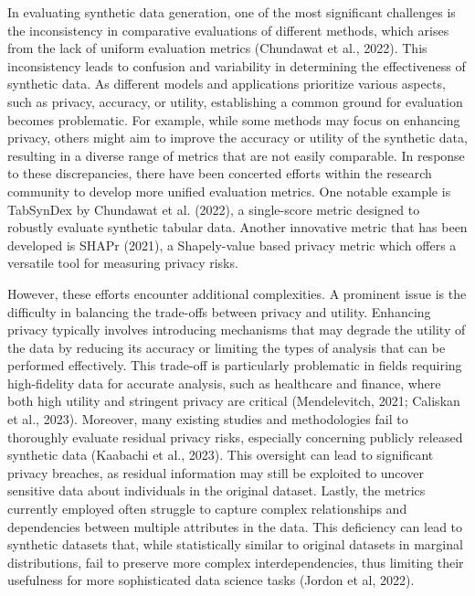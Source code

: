 \documentclass{article}
\begin{document}
In evaluating synthetic data generation, one of the most significant challenges is the inconsistency in comparative evaluations of different methods, which arises from the lack of uniform evaluation metrics (Chundawat et al., 2022). This inconsistency leads to confusion and variability in determining the effectiveness of synthetic data. As different models and applications prioritize various aspects, such as privacy, accuracy, or utility, establishing a common ground for evaluation becomes problematic. For example, while some methods may focus on enhancing privacy, others might aim to improve the accuracy or utility of the synthetic data, resulting in a diverse range of metrics that are not easily comparable. In response to these discrepancies, there have been concerted efforts within the research community to develop more unified evaluation metrics. One notable example is TabSynDex by Chundawat et al. (2022), a single-score metric designed to robustly evaluate synthetic tabular data. Another innovative metric that has been developed is SHAPr (2021), a Shapely-value based privacy metric which offers a versatile tool for measuring privacy risks.

However, these efforts encounter additional complexities. A prominent issue is the difficulty in balancing the trade-offs between privacy and utility. Enhancing privacy typically involves introducing mechanisms that may degrade the utility of the data by reducing its accuracy or limiting the types of analysis that can be performed effectively. This trade-off is particularly problematic in fields requiring high-fidelity data for accurate analysis, such as healthcare and finance, where both high utility and stringent privacy are critical (Mendelevitch, 2021; Caliskan et al., 2023). Moreover, many existing studies and methodologies fail to thoroughly evaluate residual privacy risks, especially concerning publicly released synthetic data (Kaabachi et al., 2023). This oversight can lead to significant privacy breaches, as residual information may still be exploited to uncover sensitive data about individuals in the original dataset. Lastly, the metrics currently employed often struggle to capture complex relationships and dependencies between multiple attributes in the data. This deficiency can lead to synthetic datasets that, while statistically similar to original datasets in marginal distributions, fail to preserve more complex interdependencies, thus limiting their usefulness for more sophisticated data science tasks (Jordon et al, 2022).
\end{document}
